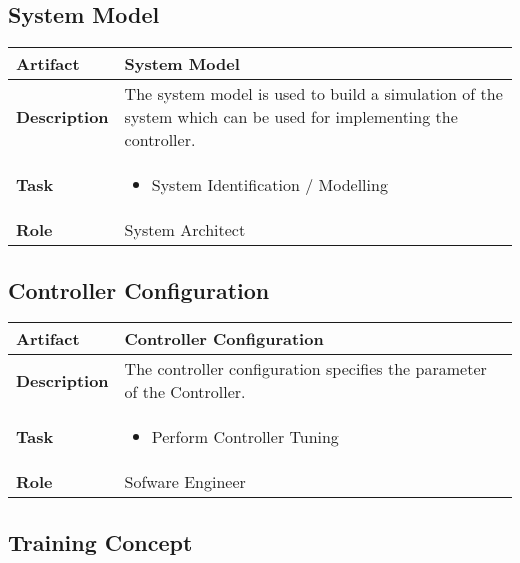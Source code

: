 \subsection{System Model}

\begin{tabularx}{\textwidth}{@{} l X @{}}
	\caption{System Model} \label{table:ch6_Artifact_System_Model}\\
	\toprule 
	\bfseries Artifact & System Model\\
	\midrule 
	\bfseries Description & The system model is used to build a simulation of the system which can be used for implementing the controller.\\
	\midrule 
	\bfseries Task & 
	\begin{itemize}
		\item System Identification / Modelling
	\end{itemize}
	\\
	\midrule 
	\bfseries Role & System Architect\\
	\bottomrule 
\end{tabularx}


\subsection{Controller Configuration}

\begin{tabularx}{\textwidth}{@{} l X @{}}
	\caption{Controller Configuration} \label{table:ch6_Artifact_Controller_Configuration}\\
	\toprule \bfseries Artifact & Controller Configuration\\
	\midrule 
	\bfseries Description & The controller configuration specifies the parameter of the Controller.\\
	\midrule 
	\bfseries Task & 
	\begin{itemize}
		\item Perform Controller Tuning
	\end{itemize}
	\\
	\midrule 
	\bfseries Role & Sofware Engineer\\
	\bottomrule 
\end{tabularx}


\subsection{Training Concept}

